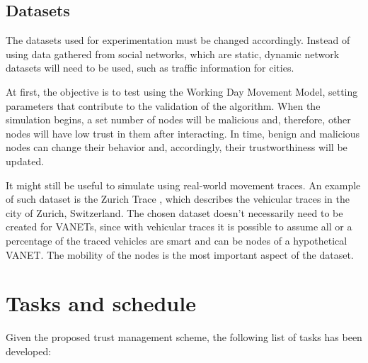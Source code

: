 \subsection{Datasets}
The datasets used for experimentation must be changed accordingly.
Instead of using data gathered from social networks, which are static, dynamic network datasets will need to be used, such as traffic information for cities.

At first, the objective is to test using the Working Day Movement Model, setting parameters that contribute to the validation of the algorithm.
When the simulation begins, a set number of nodes will be malicious and, therefore, other nodes will have low trust in them after interacting.
In time, benign and malicious nodes can change their behavior and, accordingly, their trustworthiness will be updated.

It might still be useful to simulate using real-world movement traces.
An example of such dataset is the Zurich Trace \cite{zurichtrace}, which describes the vehicular traces in the city of Zurich, Switzerland.
The chosen dataset doesn't necessarily need to be created for VANETs, since with vehicular traces it is possible to assume all or a percentage of the traced vehicles are smart and can be nodes of a hypothetical VANET.
The mobility of the nodes is the most important aspect of the dataset.

\section{Tasks and schedule}

Given the proposed trust management scheme, the following list of tasks has been developed:

